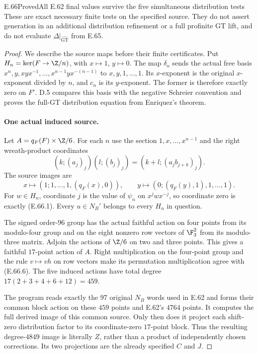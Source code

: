 \begin{statement}{E.66}{Proved}{All E.62 final values survive the five simultaneous distribution tests}
These are exact necessary finite tests on the specified source.
They do not assert generation in an additional distribution
refinement or a full profinite GT lift, and do not evaluate
$\Delta|_{\widehat{\mathrm{GT}}}$ from E.65.
\end{statement}

\begin{proof}
We describe the source maps before their finite certificates.
Put $H_n=\ker(F\to\Z/n)$, with $x\mapsto1$, $y\mapsto0$.
The map $\delta_n$ sends the actual free basis
$x^n,y,xyx^{-1},\ldots,x^{n-1}yx^{-(n-1)}$ to
$x,y,1,\ldots,1$. Its $x$-exponent is the original
$x$-exponent divided by $n$, and $c_n$ is its $y$-exponent.
The former is therefore exactly zero on $F'$. D.5 compares
this basis with the negative Schreier convention and proves the
full-GT distribution equation from Enriquez's theorem.

\paragraph{One actual induced source.}
Let $A=q_F(F)\times\Z/6$. For each $n$ use the section
$1,x,\ldots,x^{n-1}$ and the right wreath-product coordinates
\[
 (k;(a_j)_j)(l;(b_j)_j)
       =(k+l;(a_j b_{j+k})_j).
 \tag{E.66.6}
\]
The source images are
\[
 x\longmapsto(1;1,\ldots,1,(q_F(x),0)),\qquad
 y\longmapsto(0;(q_F(y),1),1,\ldots,1).
 \tag{E.66.7}
\]
For $w\in H_n$, coordinate $j$ is the value of $\psi_n$ on
$x^jwx^{-j}$, so coordinate zero is exactly \textup{(E.66.1)}.
Every $u\in N_B'$ belongs to every $H_n$ in question.

The signed order-$96$ group has the actual faithful action on
four points from its modulo-four group and on the eight nonzero
row vectors of $\F_3^2$ from its modulo-three matrix.
Adjoin the actions of $\Z/6$ on two and three points.
This gives a faithful $17$-point action of $A$. Right multiplication
on the four-point group and the rule $v\mapsto vh$ on row vectors
make its permutation multiplication agree with
\textup{(E.66.6)}. The five induced actions have total degree
$17(2+3+4+6+12)=459$.

The program reads exactly the $97$ original $N_B$ words used in
E.62 and forms their common block action on these $459$ points
and E.62's $4764$ points. It computes the full derived image of
this common source. Only then does it project each shift-zero
distribution factor to its coordinate-zero $17$-point block.
Thus the resulting degree-$4849$ image is literally $Z$, rather
than a product of independently chosen corrections. Its two
projections are the already specified $C$ and $J$.


\end{proof}
